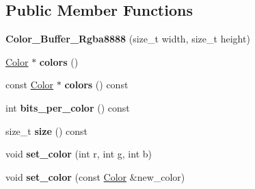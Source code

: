 \subsection*{Public Member Functions}
\begin{DoxyCompactItemize}
\item 
\mbox{\label{class_project1__3_d_a_1_1_color___buffer___rgba8888_a94288ebc46e35941090a814b5007a778}} 
{\bfseries Color\+\_\+\+Buffer\+\_\+\+Rgba8888} (size\+\_\+t width, size\+\_\+t height)
\item 
\mbox{\label{class_project1__3_d_a_1_1_color___buffer___rgba8888_a51c2926a76cefa5841c1bec711bbd76f}} 
\mbox{\hyperlink{struct_project1__3_d_a_1_1_color___buffer___rgba8888_1_1_color}{Color}} $\ast$ {\bfseries colors} ()
\item 
\mbox{\label{class_project1__3_d_a_1_1_color___buffer___rgba8888_a80910139530ede08ae5cbc8da6b18555}} 
const \mbox{\hyperlink{struct_project1__3_d_a_1_1_color___buffer___rgba8888_1_1_color}{Color}} $\ast$ {\bfseries colors} () const
\item 
\mbox{\label{class_project1__3_d_a_1_1_color___buffer___rgba8888_a470d778be0021058517dacedbadaf8ef}} 
int {\bfseries bits\+\_\+per\+\_\+color} () const
\item 
\mbox{\label{class_project1__3_d_a_1_1_color___buffer___rgba8888_a467ca349df7563834f0d5df6ef267940}} 
size\+\_\+t {\bfseries size} () const
\item 
\mbox{\label{class_project1__3_d_a_1_1_color___buffer___rgba8888_abee78dfd770816d2c209f10648b7d2b7}} 
void {\bfseries set\+\_\+color} (int r, int g, int b)
\item 
\mbox{\label{class_project1__3_d_a_1_1_color___buffer___rgba8888_a8eeb9b25ae41a50d9292d742d185b9b3}} 
void {\bfseries set\+\_\+color} (const \mbox{\hyperlink{struct_project1__3_d_a_1_1_color___buffer___rgba8888_1_1_color}{Color}} \&new\+\_\+color)

\end{DoxyCompactItemize}
